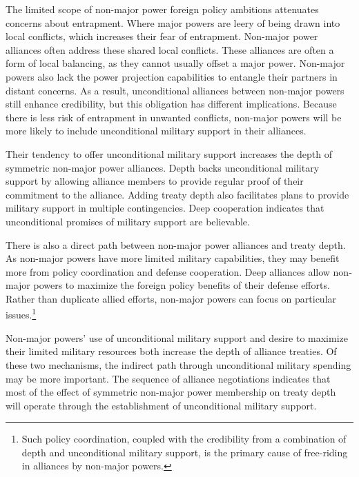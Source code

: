 \documentclass[12pt]{article}
\begin{document}
The limited scope of non-major power foreign policy ambitions attenuates concerns about entrapment. 
Where major powers are leery of being drawn into local conflicts, which increases their fear of entrapment.
Non-major power alliances often address these shared local conflicts. 
These alliances are often a form of local balancing, as they cannot usually offset a major power. 
Non-major powers also lack the power projection capabilities to entangle their partners in distant concerns. 
As a result, unconditional alliances between non-major powers still enhance credibility, but this obligation has different implications. 
Because there is less risk of entrapment in unwanted conflicts, non-major powers will be more likely to include unconditional military support in their alliances. 


Their tendency to offer unconditional military support increases the depth of symmetric non-major power alliances. 
Depth backs unconditional military support by allowing alliance members to provide regular proof of their commitment to the alliance. 
Adding treaty depth also facilitates plans to provide military support in multiple contingencies.
Deep cooperation indicates that unconditional promises of military support are believable.  


There is also a direct path between non-major power alliances and treaty depth. 
As non-major powers have more limited military capabilities, they may benefit more from policy coordination and defense cooperation. 
Deep alliances allow non-major powers to maximize the foreign policy benefits of their defense efforts. 
Rather than duplicate allied efforts, non-major powers can focus on particular issues.\footnote{Such policy coordination, coupled with the credibility from a combination of depth and unconditional military support, is the primary cause of free-riding in alliances by non-major powers.} 


Non-major powers' use of unconditional military support and desire to maximize their limited military resources both increase the depth of alliance treaties. 
Of these two mechanisms, the indirect path through unconditional military spending may be more important.
The sequence of alliance negotiations indicates that most of the effect of symmetric non-major power membership on treaty depth will operate through the establishment of unconditional military support. 
\end{document}
